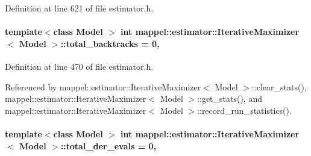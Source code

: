Definition at line 621 of file estimator.\+h.

\paragraph[{\texorpdfstring{total\+\_\+backtracks}{total_backtracks}}]{\setlength{\rightskip}{0pt plus 5cm}template$<$class Model $>$ int {\bf mappel\+::estimator\+::\+Iterative\+Maximizer}$<$ Model $>$\+::total\+\_\+backtracks = 0\hspace{0.3cm}{\ttfamily [protected]}, {\ttfamily [inherited]}}\hypertarget{classmappel_1_1estimator_1_1IterativeMaximizer_a1e081c237c989c530bb101bfb4791073}{}\label{classmappel_1_1estimator_1_1IterativeMaximizer_a1e081c237c989c530bb101bfb4791073}


Definition at line 470 of file estimator.\+h.



Referenced by mappel\+::estimator\+::\+Iterative\+Maximizer$<$ Model $>$\+::clear\+\_\+stats(), mappel\+::estimator\+::\+Iterative\+Maximizer$<$ Model $>$\+::get\+\_\+stats(), and mappel\+::estimator\+::\+Iterative\+Maximizer$<$ Model $>$\+::record\+\_\+run\+\_\+statistics().

\paragraph[{\texorpdfstring{total\+\_\+der\+\_\+evals}{total_der_evals}}]{\setlength{\rightskip}{0pt plus 5cm}template$<$class Model $>$ int {\bf mappel\+::estimator\+::\+Iterative\+Maximizer}$<$ Model $>$\+::total\+\_\+der\+\_\+evals = 0\hspace{0.3cm}{\ttfamily [protected]}, {\ttfamily [inherited]}}\hypertarget{classmappel_1_1estimator_1_1IterativeMaximizer_a79461b74a026ab06f9d1b4a9f96bdaa0}{}\label{classmappel_1_1estimator_1_1IterativeMaximizer_a79461b74a026ab06f9d1b4a9f96bdaa0}


